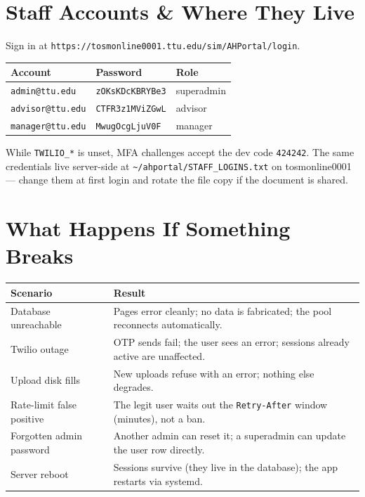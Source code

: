 \documentclass[11pt,letterpaper]{report}
\begin{document}
\section{Staff Accounts \& Where They Live}

Sign in at \texttt{https://tosmonline0001.ttu.edu/sim/AHPortal/login}.

\begin{center}
\begin{tabularx}{\textwidth}{lXl}
\toprule
\textbf{Account} & \textbf{Password} & \textbf{Role} \\
\midrule
\texttt{admin@ttu.edu} & \texttt{zOKsKDcKBRYBe3} & superadmin \\
\texttt{advisor@ttu.edu} & \texttt{CTFR3z1MViZGwL} & advisor \\
\texttt{manager@ttu.edu} & \texttt{MwugOcgLjuV0F} & manager \\
\bottomrule
\end{tabularx}
\end{center}

While \texttt{TWILIO\_*} is unset, MFA challenges accept the dev code
\texttt{424242}. The same credentials live server-side at
\texttt{\textasciitilde/ahportal/STAFF\_LOGINS.txt} on tosmonline0001 ---
change them at first login and rotate the file copy if the document is shared.

\section{What Happens If Something Breaks}

\begin{center}
\begin{tabularx}{\textwidth}{lX}
\toprule
\textbf{Scenario} & \textbf{Result} \\
\midrule
Database unreachable & Pages error cleanly; no data is fabricated; the pool
reconnects automatically. \\
Twilio outage & OTP sends fail; the user sees an error; sessions already active
are unaffected. \\
Upload disk fills & New uploads refuse with an error; nothing else degrades. \\
Rate-limit false positive & The legit user waits out the \texttt{Retry-After}
window (minutes), not a ban. \\
Forgotten admin password & Another admin can reset it; a superadmin can update
the user row directly. \\
Server reboot & Sessions survive (they live in the database); the app restarts
via systemd. \\
\bottomrule
\end{tabularx}
\end{center}
\end{document}
